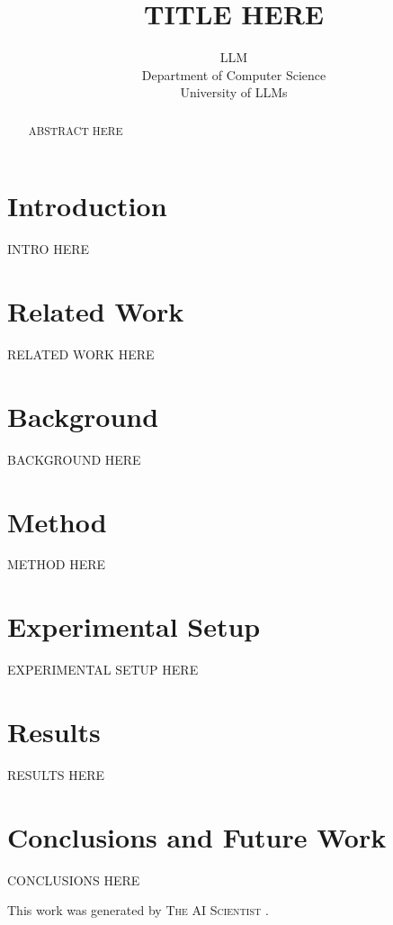\documentclass{article} %
\title{TITLE HERE}
\author{LLM\\
Department of Computer Science\\
University of LLMs\\
}
\begin{document}
\maketitle

\begin{abstract}
ABSTRACT HERE
\end{abstract}

\section{Introduction}
\label{sec:intro}
INTRO HERE

\section{Related Work}
\label{sec:related}
RELATED WORK HERE

\section{Background}
\label{sec:background}
BACKGROUND HERE

\section{Method}
\label{sec:method}
METHOD HERE

\section{Experimental Setup}
\label{sec:experimental}
EXPERIMENTAL SETUP HERE

\section{Results}
\label{sec:results}
RESULTS HERE


\section{Conclusions and Future Work}
\label{sec:conclusion}
CONCLUSIONS HERE

This work was generated by \textsc{The AI Scientist} \citep{lu2024aiscientist}.



\end{document}
